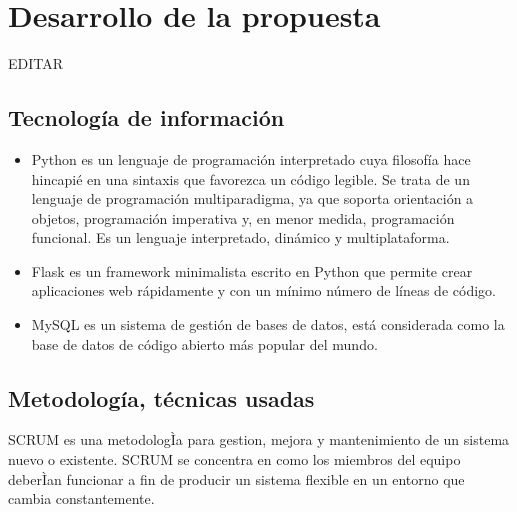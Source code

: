 \documentclass[preprint,12pt]{elsarticle}
\begin{document}



\section{Desarrollo de la propuesta}

EDITAR\\


\subsection{\textbf{Tecnología de información}}

\begin{itemize}
\item Python es un lenguaje de programación interpretado cuya filosofía hace hincapié en una sintaxis que favorezca un código legible. Se trata de un lenguaje de programación multiparadigma, ya que soporta orientación a objetos, programación imperativa y, en menor medida, programación funcional. Es un lenguaje interpretado, dinámico y multiplataforma.

\item Flask es un framework minimalista escrito en Python que permite crear aplicaciones web rápidamente y con un mínimo número de líneas de código.

\item MySQL es un sistema de gestión de bases de datos, está considerada como la base de datos de código abierto más popular del mundo.
\end{itemize}


\subsection{\textbf{Metodología, técnicas usadas}}

SCRUM es una metodologÌa para gestion, mejora y mantenimiento de un sistema nuevo o existente. SCRUM se concentra en como los miembros del equipo deberÌan funcionar a fin de producir un sistema flexible en un entorno que cambia constantemente. 


\end{document}

